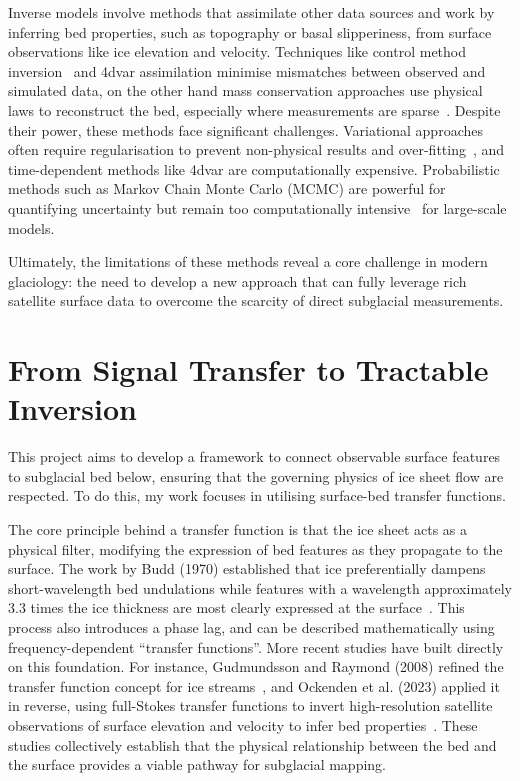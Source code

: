 Inverse models involve methods that assimilate other data sources and work by inferring bed properties, such as topography or basal slipperiness, from surface observations like ice elevation and velocity. Techniques like control method inversion~\cite{deRydt_2013} and 4dvar assimilation minimise mismatches between observed and simulated data, on the other hand mass conservation approaches use physical laws to reconstruct the bed, especially where measurements are sparse~\cite{Morlighem_2017, Morlighem_2020}. Despite their power, these methods face significant challenges. Variational approaches often require regularisation to prevent non-physical results and over-fitting~\cite{Morlighem_Goldberg_2024}, and time-dependent methods like 4dvar are computationally expensive. Probabilistic methods such as Markov Chain Monte Carlo (MCMC) are powerful for quantifying uncertainty but remain too computationally intensive~\cite{Morlighem_Goldberg_2024} for large-scale models.

Ultimately, the limitations of these methods reveal a core challenge in modern glaciology: the need to develop a new approach that can fully leverage rich satellite surface data to overcome the scarcity of direct subglacial measurements. 

\section{From Signal Transfer to Tractable Inversion}\label{theoretical_frameworks}

This project aims to develop a framework to connect observable surface features to subglacial bed below, ensuring that the governing physics of ice sheet flow are respected. To do this, my work focuses in utilising surface-bed transfer functions.

The core principle behind a transfer function is that the ice sheet acts as a physical filter, modifying the expression of bed features as they propagate to the surface. The work by Budd (1970) established that ice preferentially dampens short-wavelength bed undulations while features with a wavelength approximately $3.3$ times the ice thickness are most clearly expressed at the surface~\cite{Budd_1970}. This process also introduces a phase lag, and can be described mathematically using frequency-dependent ``transfer functions''. More recent studies have built directly on this foundation. For instance, Gudmundsson and Raymond (2008) refined the transfer function concept for ice streams~\cite{Gudmundsson_2008}, and Ockenden et al. (2023) applied it in reverse, using full-Stokes transfer functions to invert high-resolution satellite observations of surface elevation and velocity to infer bed properties~\cite{Ockenden_2023}. These studies collectively establish that the physical relationship between the bed and the surface provides a viable pathway for subglacial mapping.

